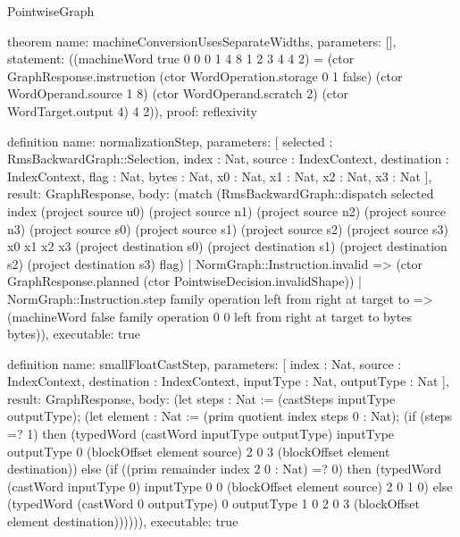 \begin{lexlean}{PointwiseGraph}
\begin{semanticmodule}
theorem{
  name: machineConversionUsesSeparateWidths,
  parameters: [],
  statement: ((machineWord true 0 0 0 1 4 8 1 2 3 4 4 2) = (ctor GraphResponse.instruction (ctor WordOperation.storage 0 1 false) (ctor WordOperand.source 1 8) (ctor WordOperand.scratch 2) (ctor WordTarget.output 4) 4 2)),
  proof: reflexivity{}
}

definition{
  name: normalizationStep,
  parameters: [
    selected : RmsBackwardGraph::Selection,
    index : Nat,
    source : IndexContext,
    destination : IndexContext,
    flag : Nat,
    bytes : Nat,
    x0 : Nat,
    x1 : Nat,
    x2 : Nat,
    x3 : Nat
  ],
  result: GraphResponse,
  body: (match (RmsBackwardGraph::dispatch selected index (project source u0) (project source n1) (project source n2) (project source n3) (project source s0) (project source s1) (project source s2) (project source s3) x0 x1 x2 x3 (project destination s0) (project destination s1) (project destination s2) (project destination s3) flag)
    | NormGraph::Instruction.invalid => (ctor GraphResponse.planned (ctor PointwiseDecision.invalidShape))
    | NormGraph::Instruction.step family operation left from right at target to => (machineWord false family operation 0 0 left from right at target to bytes bytes)),
  executable: true
}

definition{
  name: smallFloatCastStep,
  parameters: [
    index : Nat,
    source : IndexContext,
    destination : IndexContext,
    inputType : Nat,
    outputType : Nat
  ],
  result: GraphResponse,
  body: (let steps : Nat := (castSteps inputType outputType); (let element : Nat := (prim quotient index steps 0 : Nat); (if (steps =? 1) then (typedWord (castWord inputType outputType) inputType outputType 0 (blockOffset element source) 2 0 3 (blockOffset element destination)) else (if ((prim remainder index 2 0 : Nat) =? 0) then (typedWord (castWord inputType 0) inputType 0 0 (blockOffset element source) 2 0 1 0) else (typedWord (castWord 0 outputType) 0 outputType 1 0 2 0 3 (blockOffset element destination)))))),
  executable: true
}


\end{semanticmodule}
\end{lexlean}
